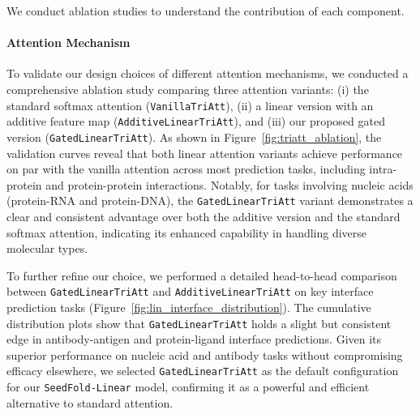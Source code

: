 \documentclass[]{bytedance_seed}
\begin{document}
We conduct ablation studies to understand the contribution of each component.



\paragraph{Attention Mechanism}
To validate our design choices of different attention mechanisms, we conducted a comprehensive ablation study comparing three attention variants: (i) the standard softmax attention (\texttt{VanillaTriAtt}), (ii) a linear version with an additive feature map (\texttt{AdditiveLinearTriAtt}), and (iii) our proposed gated version (\texttt{GatedLinearTriAtt}). As shown in Figure~\ref{fig:triatt_ablation}, the validation curves reveal that both linear attention variants achieve performance on par with the vanilla attention across most prediction tasks, including intra-protein and protein-protein interactions. Notably, for tasks involving nucleic acids (protein-RNA and protein-DNA), the \texttt{GatedLinearTriAtt} variant demonstrates a clear and consistent advantage over both the additive version and the standard softmax attention, indicating its enhanced capability in handling diverse molecular types.

To further refine our choice, we performed a detailed head-to-head comparison between \texttt{GatedLinearTriAtt} and \texttt{AdditiveLinearTriAtt} on key interface prediction tasks (Figure~\ref{fig:lin_interface_distribution}). The cumulative distribution plots show that \texttt{GatedLinearTriAtt} holds a slight but consistent edge in antibody-antigen and protein-ligand interface predictions. Given its superior performance on nucleic acid and antibody tasks without compromising efficacy elsewhere, we selected \texttt{GatedLinearTriAtt} as the default configuration for our \texttt{SeedFold-Linear} model, confirming it as a powerful and efficient alternative to standard attention.
\end{document}
